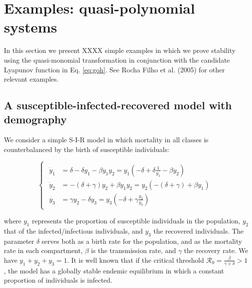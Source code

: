 \documentclass{article}
\begin{document}
\hypertarget{examples-quasi-polynomial-systems}{%
\section{Examples: quasi-polynomial
systems}\label{examples-quasi-polynomial-systems}}

In this section we present XXXX simple examples in which we prove
stability using the quasi-monomial transformation in conjunction with
the candidate Lyapunov function in Eq. \ref{eq:goh}. See Rocha Filho et
al. (2005) for other relevant examples.

\hypertarget{a-susceptible-infected-recovered-model-with-demography}{%
\subsection{A susceptible-infected-recovered model with
demography}\label{a-susceptible-infected-recovered-model-with-demography}}

\label{sec:sir}

We consider a simple S-I-R model in which mortality in all classes is
counterbalanced by the birth of susceptible individuals:

\begin{equation}
\label{eq:sir}
\begin{cases}
\begin{aligned}
\dot{y}_1 &= \delta - \delta y_1 - \beta y_1 y_2 = y_1 \left(-\delta + \delta \frac{1}{y_1} - \beta y_2 \right)\\
\dot{y}_2 &= - (\delta + \gamma) y_2 + \beta y_1 y_2 = y_2 \left(-(\delta + \gamma) + \beta y_1 \right)\\
\dot{y_3} &= \gamma y_2 - \delta y_3 = y_3 \left(-\delta + \gamma \frac{y_2}{y_3} \right)
\end{aligned}
\end{cases}
\end{equation}

where \(y_1\) represents the proportion of susceptible individuals in
the population, \(y_2\) that of the infected/infectious individuals, and
\(y_3\) the recovered individuals. The parameter \(\delta\) serves both
as a birth rate for the population, and as the mortality rate in each
compartment, \(\beta\) is the transmission rate, and \(\gamma\) the
recovery rate. We have \(y_1 + y_2 + y_3 = 1\). It is well known that if
the critical threshold
\(\mathcal R_0 = \frac{\beta}{\gamma + \delta} > 1\), the model has a
globally stable endemic equilibrium in which a constant proportion of
individuals is infected.
\end{document}
